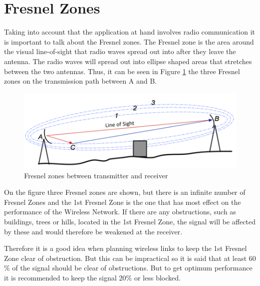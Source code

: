 \section{Fresnel Zones}\label{sec:fresnel}
Taking into account that the application at hand involves radio communication it is important to talk about the Fresnel zones. The Fresnel zone is the area around the visual line-of-sight that radio waves spread out into after they leave the antenna. The radio waves will spread out into ellipse shaped areas that stretches between the two antennas. Thus, it can be seen in Figure \ref{fig:fresnel_zones} the three Fresnel zones on the transmission path between A and B. 

\begin{figure}[H]
	\centering
	\includegraphics[scale=0.65]{figures/fresnel_zones.png}
	\caption{Fresnel zones between transmitter and receiver}
	\label{fig:fresnel_zones}
\end{figure}

On the figure three Fresnel zones are shown, but there is an infinite number of Fresnel Zones and the 1st Fresnel Zone is the one that has most effect on the performance of the Wireless Network. If there are any obstructions, such as buildings, trees or hills, located in the 1st Fresnel Zone, the signal will be affected by these and would therefore be weakened at the receiver.

Therefore it is a good idea when planning wireless links to keep the 1st Fresnel Zone clear of obstruction. But this can be impractical so it is said that at least 60 $\%$ of the signal should be clear of obstructions. But to get optimum performance it is recommended to keep the signal 20$\%$ or less blocked. \\
%
%
%
%
